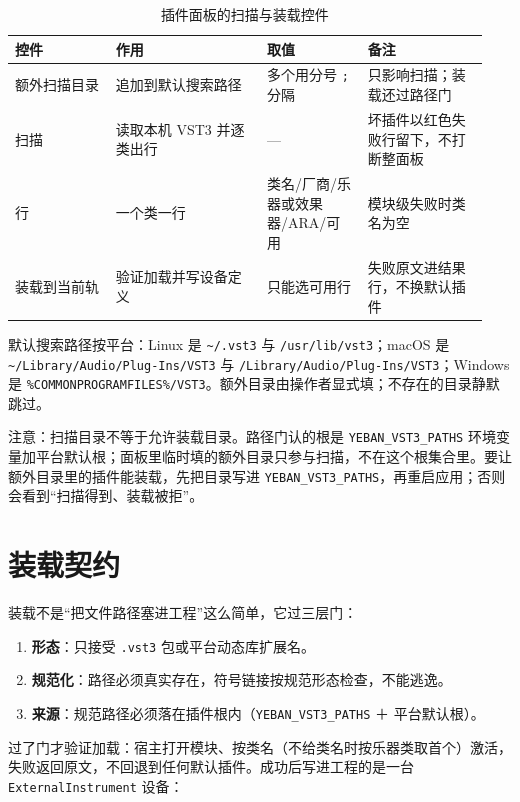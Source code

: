 \begin{table}[htbp]
\centering
\small
\begin{tabular}{@{}p{0.20\linewidth}p{0.30\linewidth}p{0.20\linewidth}p{0.24\linewidth}@{}}
\hline
控件 & 作用 & 取值 & 备注 \\
\hline
额外扫描目录 & 追加到默认搜索路径 & 多个用分号 \texttt{;} 分隔 & 只影响扫描；装载还过路径门 \\
扫描 & 读取本机 VST3 并逐类出行 & — & 坏插件以红色失败行留下，不打断整面板 \\
行 & 一个类一行 & 类名/厂商/乐器或效果器/ARA/可用 & 模块级失败时类名为空 \\
装载到当前轨 & 验证加载并写设备定义 & 只能选可用行 & 失败原文进结果行，不换默认插件 \\
\hline
\end{tabular}
\caption{插件面板的扫描与装载控件}
\label{tab:plugin-panel-controls}
\end{table}

默认搜索路径按平台：Linux 是 \texttt{\textasciitilde/.vst3} 与 \texttt{/usr/lib/vst3}；macOS 是 \texttt{\textasciitilde/Library/\allowbreak Audio/\allowbreak Plug-Ins/\allowbreak VST3} 与 \texttt{/Library/Audio/Plug-Ins/VST3}；Windows 是 \texttt{\%COMMON\allowbreak PROGRAMFILES\%/\allowbreak VST3}。额外目录由操作者显式填；不存在的目录静默跳过。

注意：扫描目录不等于允许装载目录。路径门认的根是 \texttt{YEBAN\_VST3\_PATHS} 环境变量加平台默认根；面板里临时填的额外目录只参与扫描，不在这个根集合里。要让额外目录里的插件能装载，先把目录写进 \texttt{YEBAN\_VST3\_PATHS}，再重启应用；否则会看到“扫描得到、装载被拒”。

\section{装载契约}

装载不是“把文件路径塞进工程”这么简单，它过三层门：

\begin{enumerate}
  \item \textbf{形态}：只接受 \texttt{.vst3} 包或平台动态库扩展名。
  \item \textbf{规范化}：路径必须真实存在，符号链接按规范形态检查，不能逃逸。
  \item \textbf{来源}：规范路径必须落在插件根内（\texttt{YEBAN\_VST3\_PATHS} ＋ 平台默认根）。
\end{enumerate}

过了门才验证加载：宿主打开模块、按类名（不给类名时按乐器类取首个）激活，失败返回原文，不回退到任何默认插件。成功后写进工程的是一台 \texttt{ExternalInstrument} 设备：


